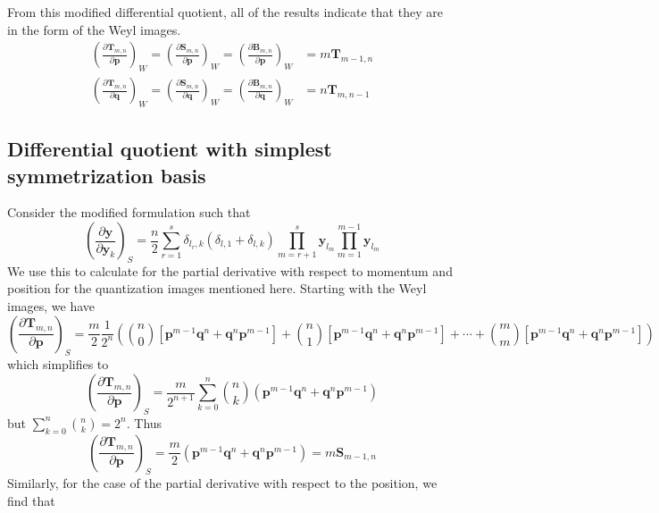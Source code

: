 \documentclass[a4paper]{article}
\theoremstyle{definition}
\begin{document}
From this modified differential quotient, all of the results indicate that they are in the form of the Weyl images.
\begin{eqnarray}
	\left( \frac{\partial\textbf{T}_{m,n}}{\partial\textbf{p}}\right)_W=\left( \frac{\partial\textbf{S}_{m,n}}{\partial\textbf{p}}\right)_W=\left( \frac{\partial\textbf{B}_{m,n}}{\partial\textbf{p}}\right)_W&=m\textbf{T}_{m-1,n} \\
	\left( \frac{\partial\textbf{T}_{m,n}}{\partial\textbf{q}}\right)_W=\left( \frac{\partial\textbf{S}_{m,n}}{\partial\textbf{q}}\right)_W=\left( \frac{\partial\textbf{B}_{m,n}}{\partial\textbf{q}}\right)_W&=n\textbf{T}_{m,n-1}
\end{eqnarray}

\subsection{Differential quotient with simplest symmetrization basis}
Consider the modified formulation such that
\begin{equation}
	\left( \frac{\partial\textbf{y}}{\partial\textbf{y}_k}\right)_S=\frac{n}{2}\sum_{r=1}^s\delta_{l_r,k}(\delta_{l,1}+\delta_{l,k})\prod_{m=r+1}^s\textbf{y}_{l_m}\prod_{m=1}^{m-1}\textbf{y}_{l_m}
\end{equation}
We use this to calculate for the partial derivative with respect to momentum and position for the quantization images mentioned here. Starting with the Weyl images, we have
\begin{equation}
	\left( \frac{\partial\textbf{T}_{m,n}}{\partial\textbf{p}}\right) _S=\frac{m}{2}\frac{1}{2^n}\left(\binom{n}{0}[\textbf{p}^{m-1}\textbf{q}^n+\textbf{q}^{n}\textbf{p}^{m-1}]+\binom{n}{1}[\textbf{p}^{m-1}\textbf{q}^n+\textbf{q}^{n}\textbf{p}^{m-1}]+\cdots+\binom{m}{m}[\textbf{p}^{m-1}\textbf{q}^n+\textbf{q}^{n}\textbf{p}^{m-1}]\right)
\end{equation}
which simplifies to
\begin{equation}
	\left( \frac{\partial\textbf{T}_{m,n}}{\partial\textbf{p}}\right) _S=\frac{m}{2^{n+1}}\sum_{k=0}^n\binom{n}{k}(\textbf{p}^{m-1}\textbf{q}^n+\textbf{q}^n\textbf{p}^{m-1})
\end{equation}
but $\displaystyle\sum_{k=0}^n\binom{n}{k}=2^n$. Thus
\begin{equation}
	\left( \frac{\partial\textbf{T}_{m,n}}{\partial\textbf{p}}\right) _S=\frac{m}{2}(\textbf{p}^{m-1}\textbf{q}^n+\textbf{q}^n\textbf{p}^{m-1})=m\textbf{S}_{m-1,n}
\end{equation}
Similarly, for the case of the partial derivative with respect to the position, we find that
\end{document}
